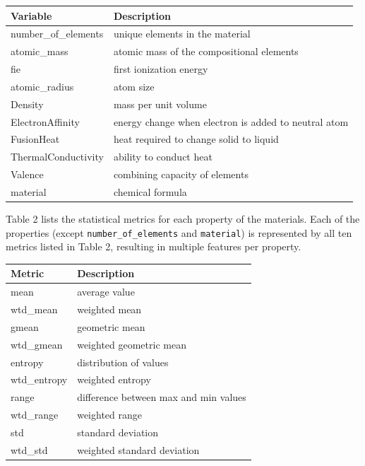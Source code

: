 \documentclass{article}      %
\begin{document}
\begin{table}[h!]
    \centering
    \begin{tabular}{|l|l|}
    \hline
    \textbf{Variable} & \textbf{Description} \\ \hline \hline
    number\_of\_elements & unique elements in the material \\ \hline
    atomic\_mass & atomic mass of the compositional elements \\ \hline
    fie & first ionization energy \\ \hline
    atomic\_radius & atom size \\ \hline
    Density & mass per unit volume \\ \hline
    ElectronAffinity & energy change when electron is added to neutral atom \\ \hline
    FusionHeat & heat required to change solid to liquid \\ \hline
    ThermalConductivity & ability to conduct heat \\ \hline
    Valence & combining capacity of elements \\ \hline
    material & chemical formula \\ \hline
    \end{tabular}
    \label{table:basic_properties}
\end{table}

Table 2 lists the statistical metrics for each property of the materials. Each of the properties (except \texttt{number\_of\_elements} and \texttt{material}) is represented by all ten metrics listed in Table 2, resulting in multiple features per property.

\begin{table}[h!]
    \centering
    \begin{tabular}{|l|l|}
    \hline
    \textbf{Metric} & \textbf{Description} \\ \hline \hline
    mean & average value \\ \hline
    wtd\_mean & weighted mean \\ \hline
    gmean & geometric mean \\ \hline
    wtd\_gmean & weighted geometric mean \\ \hline
    entropy & distribution of values \\ \hline
    wtd\_entropy & weighted entropy \\ \hline
    range & difference between max and min values \\ \hline
    wtd\_range & weighted range \\ \hline
    std & standard deviation \\ \hline
    wtd\_std & weighted standard deviation \\ \hline
    \end{tabular}
    \label{table:statistical_measures}
\end{table}
\end{document}
